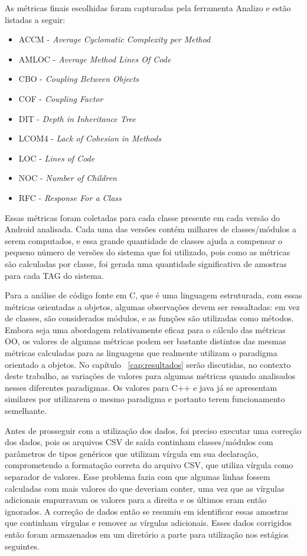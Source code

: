 As métricas finais escolhidas foram capturadas pela ferramenta Analizo e estão listadas a seguir:

\begin{itemize}
\item ACCM - \textit{Average Cyclomatic Complexity per Method}
\item AMLOC - \textit{Average Method Lines Of Code}
\item CBO - \textit{Coupling Between Objects}
\item COF - \textit{Coupling Factor}
\item DIT - \textit{Depth in Inheritance Tree}
\item LCOM4 - \textit{Lack of Cohesion in Methods}
\item LOC - \textit{Lines of Code}
\item NOC - \textit{Number of Children}
\item RFC - \textit{Response For a Class}
\end{itemize}


Essas métricas foram coletadas para cada classe presente em cada versão do Android analisada. Cada uma das versões contém milhares de classes/módulos a serem computados, e essa grande quantidade de classes ajuda a compensar o pequeno número de versões do sistema que foi utilizado, pois como as métricas são calculadas por classe, foi gerada uma quantidade significativa de amostras para cada TAG do sistema.

Para a análise de código fonte em C, que é uma linguagem estruturada, com essas métricas orientadas a objetos, algumas observações devem ser ressaltadas: em vez de classes, são considerados módulos, e as funções são utilizadas como métodos. Embora seja uma abordagem relativamente eficaz para o cálculo das métricas OO, os valores de algumas métricas podem ser bastante distintos das mesmas métricas calculadas para as linguagens que realmente utilizam o paradigma orientado a objetos. No capítulo ~\ref{cap:resultados} serão discutidas, no contexto deste trabalho, as variações de valores para algumas métricas quando analisados nesses diferentes paradigmas. Os valores para C++ e java já se apresentam similares por utilizarem o mesmo paradigma e portanto terem funcionamento semelhante.

Antes de prosseguir com a utilização dos dados, foi preciso executar uma correção dos dados, pois os arquivos CSV de saída continham classes/módulos com parâmetros de tipos genéricos que utilizam vírgula em sua declaração, comprometendo a formatação correta do arquivo CSV, que utiliza vírgula como separador de valores. Esse problema fazia com que algumas linhas fossem calculadas com mais valores do que deveriam conter, uma vez que as vírgulas adicionais empurravam os valores para a direita e os últimos eram então ignorados. A correção de dados então se resumiu em identificar essas amostras que continham vírgulas e remover as vírgulas adicionais. Esses dados corrigidos então foram armazenados em um diretório a parte para utilização nos estágios seguintes.


